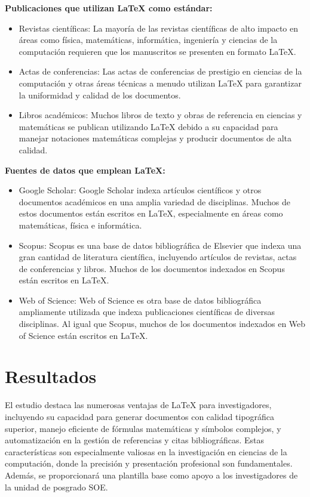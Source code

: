 \documentclass[10pt]{article}
\begin{document}
{\raggedleft \textbf{Publicaciones que utilizan LaTeX como estándar:}}

\begin{itemize}
	\item Revistas científicas: La mayoría de las revistas científicas de alto impacto en áreas como física, matemáticas, informática, ingeniería y ciencias de la computación requieren que los manuscritos se presenten en formato LaTeX.
	\item Actas de conferencias: Las actas de conferencias de prestigio en ciencias de la computación y otras áreas técnicas a menudo utilizan LaTeX para garantizar la uniformidad y calidad de los documentos.
	\item Libros académicos: Muchos libros de texto y obras de referencia en ciencias y matemáticas se publican utilizando LaTeX debido a su capacidad para manejar notaciones matemáticas complejas y producir documentos de alta calidad.
\end{itemize}

{\raggedleft \textbf{Fuentes de datos que emplean LaTeX:}}
\begin{itemize}
	\item Google Scholar: Google Scholar indexa artículos científicos y otros documentos académicos en una amplia variedad de disciplinas. Muchos de estos documentos están escritos en LaTeX, especialmente en áreas como matemáticas, física e informática.
	\item Scopus: Scopus es una base de datos bibliográfica de Elsevier que indexa una gran cantidad de literatura científica, incluyendo artículos de revistas, actas de conferencias y libros. Muchos de los documentos indexados en Scopus están escritos en LaTeX.
	\item Web of Science: Web of Science es otra base de datos bibliográfica ampliamente utilizada que indexa publicaciones científicas de diversas disciplinas. Al igual que Scopus, muchos de los documentos indexados en Web of Science están escritos en LaTeX.
\end{itemize}

\newpage %
\vspace{0.5cm}

    \section{Resultados}
    El estudio destaca las numerosas ventajas de LaTeX para investigadores, incluyendo su capacidad para generar documentos con calidad tipográfica superior, manejo eficiente de fórmulas matemáticas y símbolos complejos, y automatización en la gestión de referencias y citas bibliográficas. 
    Estas características son especialmente valiosas en la investigación en ciencias de la computación, donde la precisión y presentación profesional son fundamentales. 
    Además, se proporcionará una plantilla base como apoyo a los investigadores de la unidad de posgrado SOE.
\end{document}

